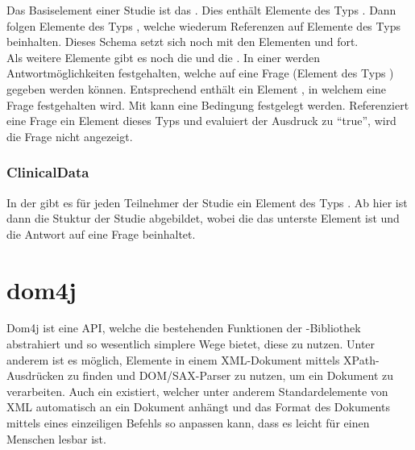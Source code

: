 Das Basiselement einer Studie ist das .
Dies enthält Elemente des Typs .
Dann folgen Elemente des Typs , welche wiederum Referenzen auf Elemente des Typs  beinhalten.
Dieses Schema setzt sich noch mit den Elementen  und  fort.\\

Als weitere Elemente gibt es noch die  und die .
In einer  werden Antwortmöglichkeiten festgehalten, welche auf eine Frage (Element des Typs ) gegeben werden können.
Entsprechend enthält  ein Element , in welchem eine Frage festgehalten wird.
Mit  kann eine Bedingung festgelegt werden.
Referenziert eine Frage ein Element dieses Typs und evaluiert der Ausdruck zu \enquote{true}, wird die Frage nicht angezeigt.

\subsubsection{ClinicalData}

In der  gibt es für jeden Teilnehmer der Studie ein Element des Typs .
Ab hier ist dann die Stuktur der Studie abgebildet, wobei die  das unterste Element ist und die Antwort auf eine Frage beinhaltet.

\section{dom4j}


Dom4j ist eine API, welche die bestehenden Funktionen der -Bibliothek abstrahiert und so wesentlich simplere Wege bietet, diese zu nutzen.
Unter anderem ist es möglich, Elemente in einem XML-Dokument mittels XPath-Ausdrücken zu finden und DOM/SAX-Parser zu nutzen, um ein Dokument zu verarbeiten.
Auch ein  existiert, welcher unter anderem Standardelemente von XML automatisch an ein Dokument anhängt und das Format des Dokuments mittels eines einzeiligen Befehls so anpassen kann, dass es leicht für einen Menschen lesbar ist.


